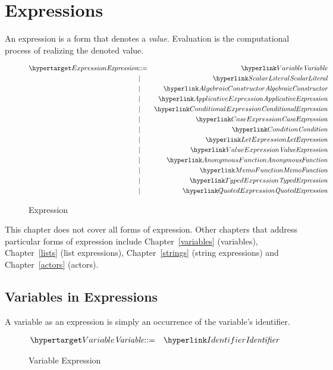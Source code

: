 \chapter{Expressions}
\label{expressions}

An expression is a form that denotes a \emph{value}. Evaluation is the computational process of realizing the denoted value.  
\begin{figure}[htbp]
\begin{eqnarray*}
\ntDef{Expression}&\arrow&\ntRef{Variable}\\
&\choice&\ntRef{ScalarLiteral}\\
&\choice&\ntRef{AlgebraicConstructor}\\
&\choice&\ntRef{ApplicativeExpression}\\
&\choice&\ntRef{ConditionalExpression}\\
&\choice&\ntRef{CaseExpression}\\
&\choice&\ntRef{Condition}\\
&\choice&\ntRef{LetExpression}\\
&\choice&\ntRef{ValueExpression}\\
&\choice&\ntRef{AnonymousFunction}\\
&\choice&\ntRef{MemoFunction}\\
&\choice&\ntRef{TypedExpression}\\
&\choice&\ntRef{QuotedExpression}
\end{eqnarray*}
\caption{Expression}
\label{expressionFig}
\end{figure}

\begin{aside}
This chapter does not cover all forms of expression. Other chapters that address particular forms of expression include Chapter~\vref{variables} (variables), Chapter~\vref{lists} (list expressions), Chapter~\vref{strings} (string expressions) and Chapter~\vref{actors} (actors).
\end{aside}

\section{Variables in Expressions}
\label{varExpression}
A variable as an expression is simply an occurrence of the variable's identifier.

\begin{figure}[htbp]
\begin{eqnarray*}
\ntDef{Variable}&\arrow&\ntRef{Identifier}
\end{eqnarray*}
\caption{Variable Expression}
\label{variableExpressionFig}
\end{figure}

